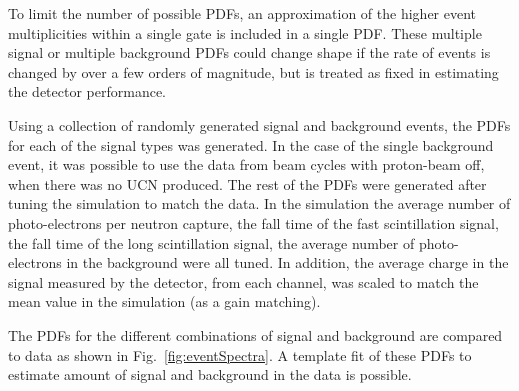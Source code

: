\documentclass[letter,twocolumn,preprint,3p]{elsarticle}
\begin{document}
To limit the number of possible PDFs, an approximation of the higher
event multiplicities within a single gate is included in a single PDF.
These multiple signal or multiple background PDFs could change shape
if the rate of events is changed by over a few orders of magnitude,
but is treated as fixed in estimating the detector performance.

Using a collection of randomly generated signal and background events,
the PDFs for each of the signal types was generated.  In the case of
the single background event, it was possible to use the data from beam
cycles with proton-beam off, when there was no UCN produced.  The rest
of the PDFs were generated after tuning the simulation to match the
data.  In the simulation the average number of photo-electrons per
neutron capture, the fall time of the fast scintillation signal, the
fall time of the long scintillation signal, the average number of
photo-electrons in the background were all tuned.  In addition, the
average charge in the signal measured by the detector, from each
channel, was scaled to match the mean value in the simulation (as a
gain matching).

The PDFs for the different combinations of signal and background are
compared to data as shown in Fig.~\ref{fig:eventSpectra}.  A template
fit of these PDFs to estimate amount of signal and background in the
data is possible.
\end{document}
